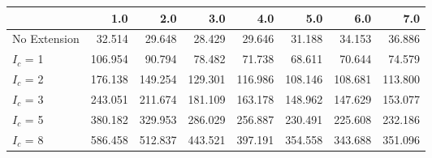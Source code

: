 \begin{tabular}{lrrrrrrr}
\toprule
{} &     1.0 &     2.0 &     3.0 &     4.0 &     5.0 &     6.0 &     7.0 \\
\midrule
No Extension &  32.514 &  29.648 &  28.429 &  29.646 &  31.188 &  34.153 &  36.886 \\
$I_c$ = 1    & 106.954 &  90.794 &  78.482 &  71.738 &  68.611 &  70.644 &  74.579 \\
$I_c$ = 2    & 176.138 & 149.254 & 129.301 & 116.986 & 108.146 & 108.681 & 113.800 \\
$I_c$ = 3    & 243.051 & 211.674 & 181.109 & 163.178 & 148.962 & 147.629 & 153.077 \\
$I_c$ = 5    & 380.182 & 329.953 & 286.029 & 256.887 & 230.491 & 225.608 & 232.186 \\
$I_c$ = 8    & 586.458 & 512.837 & 443.521 & 397.191 & 354.558 & 343.688 & 351.096 \\
\bottomrule
\end{tabular}
